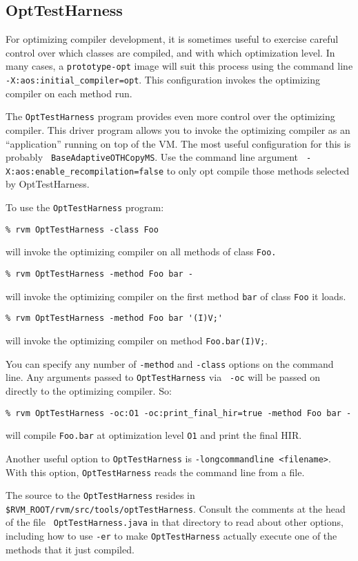 \subsection{OptTestHarness}\label{opttestharness}

For optimizing compiler development, it is sometimes useful to exercise
careful control over which classes are compiled, and with which
optimization level.  In many cases, a {\tt prototype-opt} image will
suit this process using the command line {\tt
-X:aos:initial\_compiler=opt}.  This configuration invokes the
optimizing compiler on each method run. 

The {\tt OptTestHarness} program provides even more control over the
optimizing compiler.  This driver program allows you to invoke the
optimizing compiler as an ``application'' running on top of the VM.
The most useful configuration for this is probably {\tt
BaseAdaptiveOTHCopyMS}. Use the command line argument {\tt
-X:aos:enable\_recompilation=false} to only opt compile those methods
selected by OptTestHarness. 

To use the {\tt OptTestHarness} program:
\begin{verbatim}
% rvm OptTestHarness -class Foo
\end{verbatim}
will invoke the optimizing compiler on all methods of class {\tt Foo.}

\begin{verbatim}
% rvm OptTestHarness -method Foo bar - 
\end{verbatim}
will invoke the optimizing compiler on the first method {\tt bar} of class
{\tt Foo} it loads.

\begin{verbatim}
% rvm OptTestHarness -method Foo bar '(I)V;' 
\end{verbatim} 
will invoke the optimizing compiler on method {\tt Foo.bar(I)V;}.

You can specify any number of {\tt -method} and {\tt -class} options on
the command line.  Any arguments passed to {\tt OptTestHarness} via {\tt
-oc} will be passed on directly to the optimizing compiler.  So:

\begin{verbatim}
% rvm OptTestHarness -oc:O1 -oc:print_final_hir=true -method Foo bar -
\end{verbatim} 
will compile {\tt Foo.bar} at optimization level {\tt O1} and print
the final HIR.

Another useful option to {\tt OptTestHarness} is {\tt -longcommandline
<filename>}. With this option, {\tt OptTestHarness} reads the command line
from a file.

The source to the {\tt OptTestHarness} resides in
{\tt \$RVM\_ROOT/rvm/src/tools/optTestHarness}.  Consult the comments
at the head of the file {\tt
OptTestHarness.java} in that directory to read about other options,
including how to use {\tt -er} to make {\tt OptTestHarness} 
actually execute one of the methods that it just compiled.
